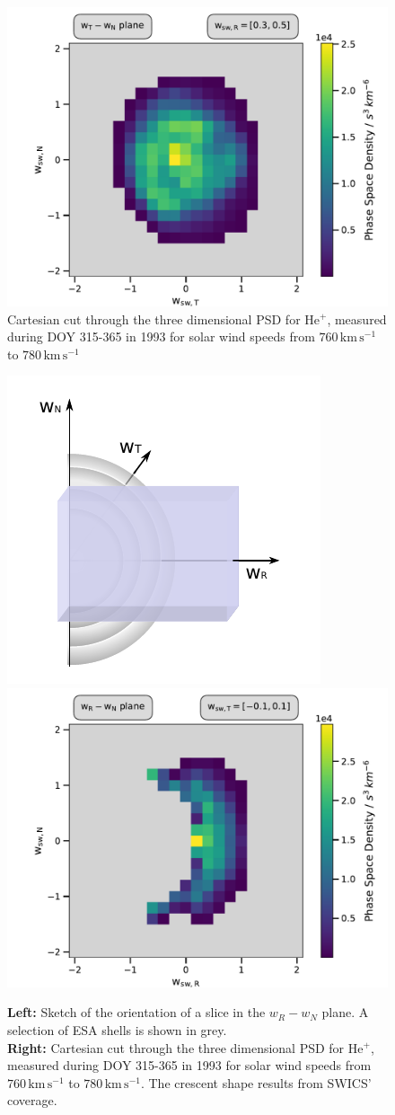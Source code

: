 \begin{figure}[h]
	\includegraphics[width=.85\textwidth]{Figures/slices_50_3.pdf}
	\centering
	\caption{Cartesian cut through the three dimensional PSD for $\mathrm{He^{+}}$, measured during DOY 315-365 in 1993 for solar wind speeds from $760 \, \mathrm{km\,s^{-1}}$ to $780 \, \mathrm{km\,s^{-1}}$}
	\label{fig:psd_50}
\end{figure}
\begin{figure}[h]
	\includegraphics[width=.34\textwidth]{Figures/sketch_slice_T2.pdf}
	\includegraphics[width=.64\textwidth]{Figures/slice_50_T.pdf}
	\centering
	\caption{\textbf{Left:} Sketch of the orientation of a slice in the $w_R - w_N$ plane. A selection of ESA shells is shown in grey.\\ \textbf{Right:} Cartesian cut through the three dimensional PSD for $\mathrm{He^{+}}$, measured during DOY 315-365 in 1993 for solar wind speeds from $760 \, \mathrm{km\,s^{-1}}$ to $780 \, \mathrm{km\,s^{-1}}$. The crescent shape results from SWICS' coverage.}
	\label{fig:sketch_slice_T}
\end{figure}
